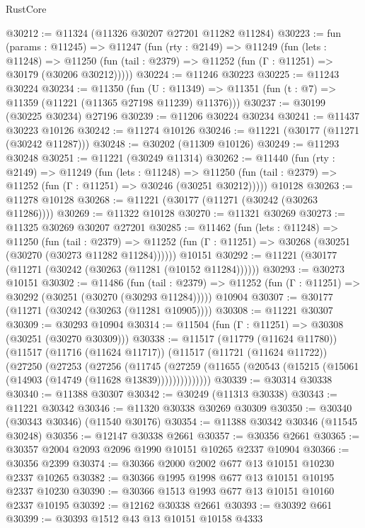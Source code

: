 \begin{lexlean}{RustCore}
\begin{coremodule}
@30212 := @11324 (@11326 @30207 @27201 @11282 @11284)
@30223 := fun (params : @11245) =>
  @11247
    (fun (rty : @2149) =>
    @11249
      (fun (lets : @11248) =>
      @11250 (fun (tail : @2379) => @11252 (fun (Γ : @11251) => @30179 (@30206 @30212)))))
@30224 := @11246 @30223
@30225 := @11243 @30224
@30234 := @11350
    (fun (U : @11349) => @11351 (fun (t : @7) => @11359 (@11221 (@11365 @27198 @11239) @11376)))
@30237 := @30199 (@30225 @30234) @27196
@30239 := @11206 @30224 @30234
@30241 := @11437 @30223 @10126
@30242 := @11274 @10126
@30246 := @11221 (@30177 (@11271 (@30242 @11287)))
@30248 := @30202 (@11309 @10126)
@30249 := @11293 @30248
@30251 := @11221 (@30249 @11314)
@30262 := @11440
    (fun (rty : @2149) =>
    @11249
      (fun (lets : @11248) =>
      @11250 (fun (tail : @2379) => @11252 (fun (Γ : @11251) => @30246 (@30251 @30212)))))
    @10128
@30263 := @11278 @10128
@30268 := @11221 (@30177 (@11271 (@30242 (@30263 @11286))))
@30269 := @11322 @10128
@30270 := @11321 @30269
@30273 := @11325 @30269 @30207 @27201
@30285 := @11462
    (fun (lets : @11248) =>
    @11250
      (fun (tail : @2379) =>
      @11252 (fun (Γ : @11251) => @30268 (@30251 (@30270 (@30273 @11282 @11284))))))
    @10151
@30292 := @11221 (@30177 (@11271 (@30242 (@30263 (@11281 (@10152 @11284))))))
@30293 := @30273 @10151
@30302 := @11486
    (fun (tail : @2379) => @11252 (fun (Γ : @11251) => @30292 (@30251 (@30270 (@30293 @11284)))))
    @10904
@30307 := @30177 (@11271 (@30242 (@30263 (@11281 @10905))))
@30308 := @11221 @30307
@30309 := @30293 @10904
@30314 := @11504 (fun (Γ : @11251) => @30308 (@30251 (@30270 @30309)))
@30338 := @11517
    (@11779 (@11624 @11780))
    (@11517
      (@11716 (@11624 @11717))
      (@11517
        (@11721 (@11624 @11722))
        (@27250
          (@27253
            (@27256
              (@11745
                (@27259 (@11655 (@20543 (@15215 (@15061 (@14903 (@14749 (@11628 @13839))))))))))))))
@30339 := @30314 @30338
@30340 := @11388 @30307
@30342 := @30249 (@11313 @30338)
@30343 := @11221 @30342
@30346 := @11320 @30338 @30269 @30309
@30350 := @30340 (@30343 @30346) (@11540 @30176)
@30354 := @11388 @30342 @30346 (@11545 @30248)
@30356 := @12147 @30338 @2661
@30357 := @30356 @2661
@30365 := @30357 @2004 @2093 @2096 @1990 @10151 @10265 @2337 @10904
@30366 := @30356 @2399
@30374 := @30366 @2000 @2002 @677 @13 @10151 @10230 @2337 @10265
@30382 := @30366 @1995 @1998 @677 @13 @10151 @10195 @2337 @10230
@30390 := @30366 @1513 @1993 @677 @13 @10151 @10160 @2337 @10195
@30392 := @12162 @30338 @2661
@30393 := @30392 @661
@30399 := @30393 @1512 @43 @13 @10151 @10158 @4333

\end{coremodule}
\end{lexlean}
